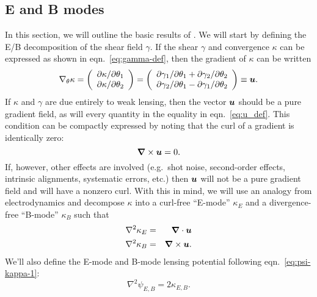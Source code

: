 \subsection{E and B modes}
In this section, we will outline the basic results of \citet{Schneider02b}.
We will start by defining the E/B decomposition of the shear field $\gamma$.
If the shear $\gamma$ and convergence $\kappa$ can be expressed as shown
in eqn.~\ref{eq:gamma-def}, then the gradient of $\kappa$ can be written
\begin{equation}
  \label{eq:u_def}
  \nabla_\theta \kappa =
  \left(
  \begin{array}{l}
    \partial \kappa / \partial\theta_1\\
    \partial \kappa / \partial\theta_2 
  \end{array}
  \right) 
  =
  \left(
  \begin{array}{l}
    \partial \gamma_1 / \partial\theta_1 + \partial\gamma_2/\partial\theta_2\\
    \partial \gamma_2 / \partial\theta_1 - \partial\gamma_1/\partial\theta_2
  \end{array}
  \right)
  \equiv
  \boldsymbol{u}.
\end{equation}
If $\kappa$ and $\gamma$ are due entirely to weak lensing, then the vector
$\boldsymbol{u}$ should be a pure gradient field, as will every
quantity in the equality in eqn.~\ref{eq:u_def}.  This condition can be
compactly expressed by noting that the curl of a gradient is identically
zero:
\begin{equation}
  \label{eq:curl-free}
  \boldsymbol{\nabla} \times \boldsymbol{u} = 0.
\end{equation}
If, however, other effects are involved (e.g.~shot noise, second-order effects,
intrinsic alignments, systematic errors, etc.)
then $\boldsymbol{u}$ will not be a pure gradient field and will have
a nonzero curl.
With this in mind, we will use an analogy from electrodynamics and decompose
$\kappa$ into a curl-free ``E-mode'' $\kappa_E$ and a divergence-free
``B-mode'' $\kappa_B$ such that
\begin{eqnarray}
  \nabla^2 \kappa_E &=& \boldsymbol{\nabla} \cdot \boldsymbol{u}\\
  \nabla^2 \kappa_B &=& \boldsymbol{\nabla} \times \boldsymbol{u}.
\end{eqnarray}
We'll also define the E-mode and B-mode lensing potential following
eqn.~\ref{eq:psi-kappa-1}:
\begin{equation}
  \nabla^2 \psi_{E, B} = 2\kappa_{E, B}.
\end{equation}
